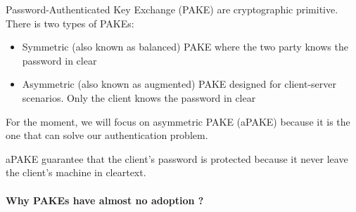 \documentclass[../report.tex]{subfiles}
\begin{document}




Password-Authenticated Key Exchange (PAKE) are cryptographic primitive. There is two types of PAKEs: 

\begin{itemize}
 \item Symmetric (also known as balanced) PAKE where the two party knows the password in clear
 \item Asymmetric (also known as augmented) PAKE designed for client-server scenarios. Only the client knows the password in clear
\end{itemize}

For the moment, we will focus on asymmetric PAKE (aPAKE) because it is the one that can solve our authentication problem.

aPAKE guarantee that the client's password is protected because it never leave the client's machine in cleartext.




\paragraph{Why PAKEs have almost no adoption ?}
\end{document}
